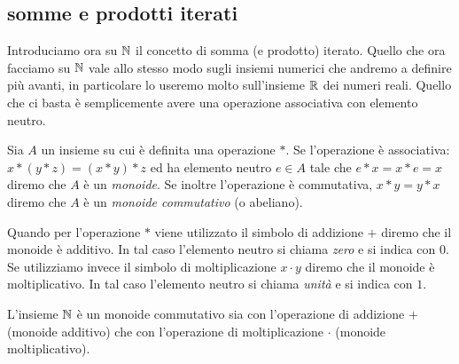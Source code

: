 \subsection{somme e prodotti iterati}
%
%

Introduciamo ora su ${\mathbb N}$ il concetto di somma (e prodotto) iterato.
Quello che ora facciamo su ${\mathbb N}$ vale allo stesso modo sugli insiemi 
numerici che andremo a definire più avanti, in particolare lo useremo 
molto sull'insieme ${\mathbb R}$ dei numeri reali. 
Quello che ci basta è semplicemente avere una operazione associativa 
con elemento neutro. 

\begin{definition}[monoide]%
\label{def:monoide}%
Sia $A$ un insieme su cui è definita una operazione $*$.
Se l'operazione è associativa: $x*(y*z) = (x*y)*z$ 
ed ha elemento neutro $e\in A$ tale che $e*x = x*e = x$
diremo che $A$ è un \emph{monoide}.
Se inoltre l'operazione è commutativa, $x*y=y*x$ 
diremo che $A$ è un \emph{monoide commutativo} (o abeliano).

Quando per l'operazione $*$ viene utilizzato il simbolo di addizione $+$
diremo che il monoide è additivo. In tal caso l'elemento neutro 
si chiama \emph{zero} e si indica con $0$.
Se utilizziamo invece il simbolo di moltiplicazione $x\cdot y$
diremo che il monoide è moltiplicativo. In tal caso l'elemento 
neutro si chiama \emph{unità} e si indica con $1$.
\end{definition}

L'insieme ${\mathbb N}$ è un monoide commutativo sia con l'operazione di addizione $+$ 
(monoide additivo) che con l'operazione di moltiplicazione 
$\cdot$ (monoide moltiplicativo).

